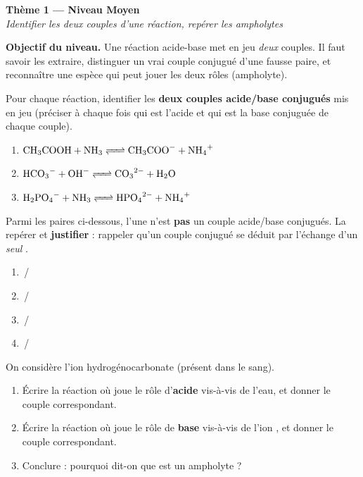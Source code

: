 \documentclass[11pt,a4paper]{article}
\begin{document}
\begin{center}
{\LARGE\bfseries\color{primarydark} Thème 1 --- Niveau Moyen}\\[2pt]
{\color{primary}\itshape Identifier les deux couples d'une réaction, repérer les ampholytes}
\end{center}

\begin{consigne}
\textbf{Objectif du niveau.} Une réaction acide-base met en jeu \emph{deux} couples. Il faut savoir les
extraire, distinguer un vrai couple conjugué d'une fausse paire, et reconnaître une espèce qui peut jouer les
deux rôles (ampholyte).
\end{consigne}

\begin{exobox}
Pour chaque réaction, identifier les \textbf{deux couples acide/base conjugués} mis en jeu (préciser à chaque
fois qui est l'acide et qui est la base conjuguée de chaque couple).
\begin{enumerate}[label=\alph*),leftmargin=1.6em,itemsep=2pt]
  \item $\ce{CH3COOH + NH3 <=> CH3COO- + NH4+}$
  \item $\ce{HCO3- + OH- <=> CO3^{2-} + H2O}$
  \item $\ce{H2PO4- + NH3 <=> HPO4^{2-} + NH4+}$
\end{enumerate}
\end{exobox}

\begin{exobox}
Parmi les paires ci-dessous, l'une n'est \textbf{pas} un couple acide/base conjugués. La repérer et
\textbf{justifier} : rappeler qu'un couple conjugué se déduit par l'échange d'un \emph{seul} .
\begin{enumerate}[label=\alph*),leftmargin=1.6em,itemsep=1pt]
  \item {}\,/\,
  \item {}\,/\,
  \item {}\,/\,
  \item {}\,/\,
\end{enumerate}
\end{exobox}

\begin{exobox}
On considère l'ion hydrogénocarbonate  (présent dans le sang).
\begin{enumerate}[label=\alph*),leftmargin=1.6em,itemsep=2pt]
  \item Écrire la réaction où  joue le rôle d'\textbf{acide} vis-à-vis de l'eau, et donner le couple
        correspondant.
  \item Écrire la réaction où  joue le rôle de \textbf{base} vis-à-vis de l'ion , et donner
        le couple correspondant.
  \item Conclure : pourquoi dit-on que  est un ampholyte ?
\end{enumerate}
\end{exobox}
\end{document}
